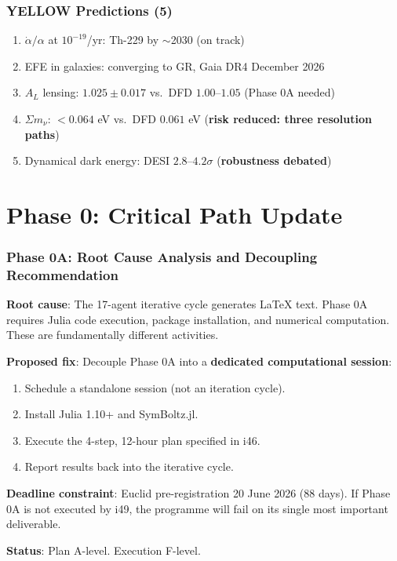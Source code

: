 \documentclass[11pt,a4paper]{article}
\begin{document}
\section{YELLOW Predictions (5)}

\begin{enumerate}
\item $\dot{\alpha}/\alpha$ at $10^{-19}$/yr: Th-229 by $\sim$2030 (on track)
\item EFE in galaxies: converging to GR, Gaia DR4 December 2026
\item $A_L$ lensing: $1.025 \pm 0.017$ vs.\ DFD $1.00$--$1.05$ (Phase 0A needed)
\item $\Sigma m_\nu$: $< 0.064$ eV vs.\ DFD $0.061$ eV (\textbf{risk reduced: three resolution paths})
\item Dynamical dark energy: DESI $2.8$--$4.2\sigma$ (\textbf{robustness debated})
\end{enumerate}


\part{Phase 0: Critical Path Update}

\section{Phase 0A: Root Cause Analysis and Decoupling Recommendation}

\begin{tcolorbox}[colback=red!5!white, colframe=red!60!black,
  title={Phase 0A: SIX ITERATIONS WITHOUT EXECUTION --- Root Cause and Fix}]

\textbf{Root cause}: The 17-agent iterative cycle generates LaTeX text. Phase 0A requires Julia code execution, package installation, and numerical computation. These are fundamentally different activities.

\textbf{Proposed fix}: Decouple Phase 0A into a \textbf{dedicated computational session}:
\begin{enumerate}
\item Schedule a standalone session (not an iteration cycle).
\item Install Julia 1.10+ and SymBoltz.jl.
\item Execute the 4-step, 12-hour plan specified in i46.
\item Report results back into the iterative cycle.
\end{enumerate}

\textbf{Deadline constraint}: Euclid pre-registration 20 June 2026 (88 days). If Phase 0A is not executed by i49, the programme will fail on its single most important deliverable.

\textbf{Status}: Plan A-level. Execution F-level.
\end{tcolorbox}
\end{document}
